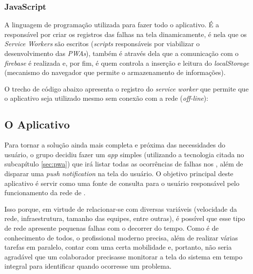 \subsubsection{JavaScript}
\label{subsubsec:javascript}

A linguagem de programação utilizada para fazer todo o aplicativo. É a responsável por criar os registros das falhas na tela dinamicamente, é nela que os \textit{Service Workers} são escritos (\textit{scripts} responsáveis por viabilizar o desenvolvimento das \textit{PWAs}), também é através dela que a comunicação com o \textit{firebase} é realizada e, por fim, é quem controla a inserção e leitura do \textit{localStorage} (mecanismo do navegador que permite o armazenamento de informações).

O trecho de código abaixo apresenta o registro do \textit{service worker} que permite que o aplicativo seja utilizado mesmo sem conexão com a rede (\textit{off-line}):

\vspace*{1cm}
\begin{python}
    if ('serviceWorker' in navigator) {
        navigator.serviceWorker
            .register('service-worker.js')
            .then(reg => console.log("[ServiceWorker] Registered..."))
            [ . . .]
\end{python}
\vspace*{1cm}



\subsection{O Aplicativo}
\label{subsec:o_aplicativo}

Para tornar a solução ainda mais completa e próxima das necessidades do usuário, o grupo decidiu fazer um \textit{app} simples (utilizando a tecnologia citada no subcapítulo \ref{sec:pwa}) que irá listar todas as ocorrências de falhas nos \containers{}, além de disparar uma \textit{push notification} na tela do usuário. O objetivo principal deste aplicativo é servir como uma fonte de consulta para o usuário responsável pelo funcionamento da rede de \containers{}.

Isso porque, em virtude de relacionar-se com diversas variáveis (velocidade da rede, infraestrutura, tamanho das equipes, entre outras), é possível que esse tipo de rede apresente pequenas falhas com o decorrer do tempo. Como é de conhecimento de todos, o profissional moderno precisa, além de realizar várias tarefas em paralelo, contar com uma certa mobilidade e, portanto, não seria agradável que um colaborador precisasse monitorar a tela do sistema em tempo integral para identificar quando ocorresse um problema.

